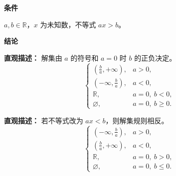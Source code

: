 \begin{statementbox}

	\textbf{\textcolor{CStatement}{条件}}
	\begin{description}[style=nextline, leftmargin=2.8em, labelsep=0.5em, itemsep=0.35em]
		\item[\textbf{\textcolor{CStatement}{条件 1（一次含参）：}}] $a,b\in\mathbb{R}$，$x$ 为未知数，不等式 $ax>b$。
	\end{description}

	\textbf{\textcolor{CStatement}{结论}}
	\begin{description}[style=nextline, leftmargin=2.8em, labelsep=0.5em, itemsep=0.45em]
		\item[\textbf{\textcolor{CStatement}{结论一（分类规则）：}}]
			\textbf{\textcolor{CStatement}{直观描述：}}
			解集由 $a$ 的符号和 $a=0$ 时 $b$ 的正负决定。
			\[
				\begin{cases}
					\left(\frac{b}{a}, +\infty\right), & a>0,\\
					\left(-\infty, \frac{b}{a}\right), & a<0,\\
					\mathbb{R}, & a=0,\ b<0,\\
					\varnothing, & a=0,\ b\ge 0.
			\end{cases}
			\]

		\item[\textbf{\textcolor{CStatement}{推广结论（不等号反向）：}}]
			\textbf{\textcolor{CStatement}{直观描述：}}
			若不等式改为 $ax<b$，则解集规则相反。
			\[
				\begin{cases}
					\left(-\infty, \frac{b}{a}\right), & a>0,\\
					\left(\frac{b}{a}, +\infty\right), & a<0,\\
					\mathbb{R}, & a=0,\ b>0,\\
					\varnothing, & a=0,\ b\le 0.
			\end{cases}
			\]
	\end{description}

\end{statementbox}
